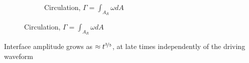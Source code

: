 \begin{frame}
\begin{figure}
{\begin{subfigure}[b]{0.32\textwidth}
      \caption{Circulation, $\Gamma = \int_{A_R} \omega dA$}
    \end{subfigure}
    }
  \end{figure}
  Interface amplitude grows as $\approx t^{\nicefrac{3}{5}}$, at late times independently of the driving waveform\\
\end{frame}
%
